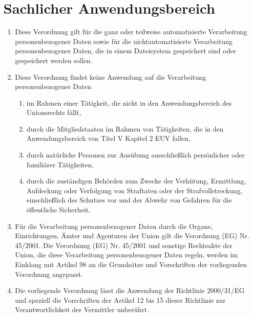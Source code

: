 \chapter{Sachlicher Anwendungsbereich}
\label{ch:02}


\begin{enumerate}

  \item Diese Verordnung gilt für die ganz oder teilweise automatisierte Verarbeitung personenbezogener Daten sowie für
   die nichtautomatisierte Verarbeitung personenbezogener Daten, die in einem Dateisystem gespeichert sind oder
   gespeichert werden sollen.

  \item Diese Verordnung findet keine Anwendung auf die Verarbeitung personenbezogener Daten

  \begin{enumerate}
  
    \item im Rahmen einer Tätigkeit, die nicht in den Anwendungsbereich des Unionsrechts fällt,

    \item durch die Mitgliedstaaten im Rahmen von Tätigkeiten, die in den Anwendungsbereich von Titel V Kapitel 2
     EUV fallen,

    \item durch natürliche Personen zur Ausübung ausschließlich persönlicher oder familiärer Tätigkeiten,

    \item durch die zuständigen Behörden zum Zwecke der Verhütung, Ermittlung, Aufdeckung oder Verfolgung von Straftaten
     oder der Strafvollstreckung, einschließlich des Schutzes vor und der Abwehr von Gefahren für die öffentliche
     Sicherheit.

  \end{enumerate}

  \item Für die Verarbeitung personenbezogener Daten durch die Organe, Einrichtungen, Ämter und Agenturen der Union gilt
   die Verordnung (EG) Nr. 45/2001. Die Verordnung (EG) Nr. 45/2001 und sonstige Rechtsakte der Union, die diese
   Verarbeitung personenbezogener Daten regeln, werden im Einklang mit Artikel 98 an die Grundsätze
   und Vorschriften der vorliegenden Verordnung angepasst.

  \item Die vorliegende Verordnung lässt die Anwendung der Richtlinie 2000/31/EG und speziell die Vorschriften der
   Artikel 12 bis 15 dieser Richtlinie zur Verantwortlichkeit der Vermittler unberührt.

\end{enumerate}

